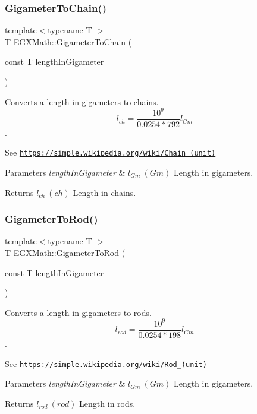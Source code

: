 \subsubsection{\texorpdfstring{Gigameter\+To\+Chain()}{GigameterToChain()}}
{\footnotesize\ttfamily template$<$typename T $>$ \\
T E\+G\+X\+Math\+::\+Gigameter\+To\+Chain (\begin{DoxyParamCaption}\item[{const T}]{length\+In\+Gigameter }\end{DoxyParamCaption})}



Converts a length in gigameters to chains. \[ l_{ch}= \frac{10^{9}}{0.0254 * 792} l_{Gm} \]. 

See \href{https://simple.wikipedia.org/wiki/Chain_(unit)}{\tt https\+://simple.\+wikipedia.\+org/wiki/\+Chain\+\_\+(unit)} 
\begin{DoxyParams}{Parameters}
{\em length\+In\+Gigameter} & $ l_{Gm}\ (Gm)$ Length in gigameters. \\
\hline
\end{DoxyParams}
\begin{DoxyReturn}{Returns}
$ l_{ch}\ (ch)$ Length in chains. 
\end{DoxyReturn}
\mbox{\label{group___e_g_x_math-_conversions-_length_conversions-_gigameter-_surveyors_ga73a408111b846e3cb97aa1990135ec46}} 
\subsubsection{\texorpdfstring{Gigameter\+To\+Rod()}{GigameterToRod()}}
{\footnotesize\ttfamily template$<$typename T $>$ \\
T E\+G\+X\+Math\+::\+Gigameter\+To\+Rod (\begin{DoxyParamCaption}\item[{const T}]{length\+In\+Gigameter }\end{DoxyParamCaption})}



Converts a length in gigameters to rods. \[ l_{rod}= \frac{10^{9}}{0.0254 * 198} l_{Gm} \]. 

See \href{https://simple.wikipedia.org/wiki/Rod_(unit)}{\tt https\+://simple.\+wikipedia.\+org/wiki/\+Rod\+\_\+(unit)} 
\begin{DoxyParams}{Parameters}
{\em length\+In\+Gigameter} & $ l_{Gm}\ (Gm)$ Length in gigameters. \\
\hline
\end{DoxyParams}
\begin{DoxyReturn}{Returns}
$ l_{rod}\ (rod)$ Length in rods. 
\end{DoxyReturn}
